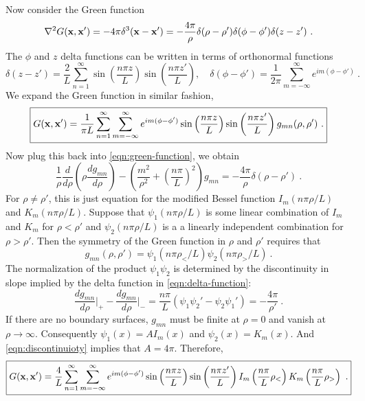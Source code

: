 \documentclass[12pt]{article}
\newcommand{\x}{{\bf x}}
\newcommand{\lb}{\left(}
\newcommand{\rb}{\right)}
\begin{document}
\newpage
{} Now consider the Green function
\begin{equation}\label{eqn:green-function}
    \nabla^2 G(\x, \x') = -4\pi \delta^3(\x - \x') = - \frac{4\pi}{\rho} \delta(\rho - \rho') \delta(\phi - \phi') \delta(z - z')~.
\end{equation}
The $\phi$ and $z$ delta functions can be written in terms of orthonormal functions
\begin{equation}
    \delta(z - z') = \frac{2}{L}\sum_{n=1}^\infty\sin\lb\frac{n \pi z}{L}\rb \sin\lb\frac{n \pi z'}{L}\rb, \quad \delta(\phi - \phi') = \frac{1}{2\pi} \sum_{m = -\infty}^\infty e^{im(\phi-\phi')}~.
\end{equation}
We expand the Green function in similar fashion,
\begin{equation}
    \boxed{
    G(\x, \x') = \frac{1}{\pi L}\sum_{n = 1}^\infty  \sum_{m = - \infty}^\infty e^{im(\phi - \phi')} \sin\lb\frac{n \pi z}{L}\rb\sin\lb\frac{n \pi z'}{L}\rb g_{mn}(\rho, \rho')~.
    }
\end{equation}
Now plug this back into \eqref{eqn:green-function}, we obtain
\begin{equation}\label{eqn:delta-function}
    \frac{1}{\rho} \frac{d}{d \rho} \lb \rho \frac{d g_{mn}}{d \rho}\rb - \lb \frac{m^2}{\rho^2} + \lb  \frac{n \pi}{L}\rb^2\rb g_{mn} = - \frac{4\pi}{\rho} \delta(\rho - \rho')~.
\end{equation}
For $\rho \neq \rho'$, this is just equation for the modified Bessel function $I_m(n \pi \rho /L)$ and $K_m(n \pi \rho /L)$. Suppose that $\psi_1(n \pi \rho/L)$ is some linear combination of $I_m$ and $K_m$ for $\rho < \rho'$ and $\psi_2(n \pi \rho/L)$ is a a linearly independent combination for $\rho > \rho'$. Then the symmetry of the Green function in $\rho$ and $\rho'$ requires that
\begin{equation}
    g_{mn}(\rho, \rho') = \psi_1(n\pi \rho_</L) \psi_2(n \pi \rho_>/L)~.
\end{equation}
The normalization of the product $\psi_1 \psi_2$ is determined by the discontinuity in slope implied by the delta function in \eqref{eqn:delta-function}:
\begin{equation}\label{eqn:discontinuioty}
    \frac{d g_{mn}}{d \rho}\Bigg|_+ - \frac{d g_{mn}}{d\rho}\Bigg|_- = \frac{n \pi }{L}(\psi_1 \psi_2' - \psi_2 \psi_1') = - \frac{4\pi}{\rho'}~.
\end{equation}
If there are no boundary surfaces, $g_{mn}$ must be finite at $\rho = 0$ and vanish at $\rho \to \infty$. Consequently $\psi_1(x) = AI_m(x)$ and $\psi_2(x) = K_m(x)$. And \eqref{eqn:discontinuioty} implies that $A = 4\pi$. Therefore,
\begin{equation}
    \boxed{G(\x, \x') = \frac{4}{ L}\sum_{n = 1}^\infty  \sum_{m = - \infty}^\infty e^{im(\phi - \phi')} \sin\lb\frac{n \pi z}{L}\rb\sin\lb\frac{n \pi z'}{L}\rb I_m\lb \frac{n \pi }{L} \rho_<\rb K_m\lb \frac{n \pi }{L}\rho_>\rb~.}
\end{equation}
\end{document}
